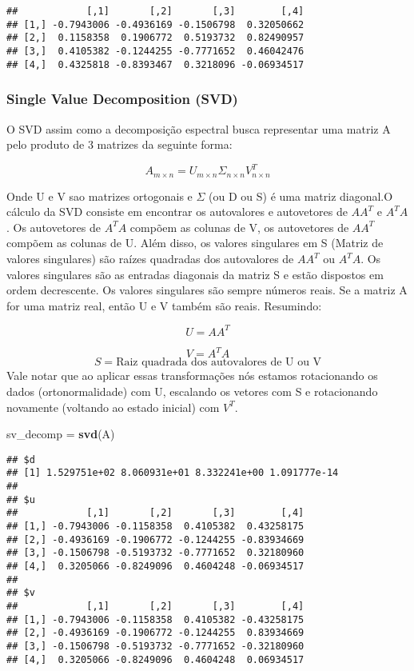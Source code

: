 \documentclass[
]{article}
\newenvironment{Shaded}{\begin{snugshade}}{\end{snugshade}}
\newcommand{\FunctionTok}[1]{\textcolor[rgb]{0.13,0.29,0.53}{\textbf{#1}}}
\newcommand{\NormalTok}[1]{#1}
\newcommand{\OtherTok}[1]{\textcolor[rgb]{0.56,0.35,0.01}{#1}}
\begin{document}
\begin{verbatim}
##            [,1]       [,2]       [,3]        [,4]
## [1,] -0.7943006 -0.4936169 -0.1506798  0.32050662
## [2,]  0.1158358  0.1906772  0.5193732  0.82490957
## [3,]  0.4105382 -0.1244255 -0.7771652  0.46042476
## [4,]  0.4325818 -0.8393467  0.3218096 -0.06934517
\end{verbatim}

\newpage

\hypertarget{single-value-decomposition-svd}{%
\subsubsection{Single Value Decomposition
(SVD)}\label{single-value-decomposition-svd}}

O SVD assim como a decomposição espectral busca representar uma matriz A
pelo produto de 3 matrizes da seguinte forma:

\[
A_{m \times n} = U_{m \times n} \Sigma_{n \times n} V^{T}_{n \times n}
\]

Onde U e V sao matrizes ortogonais e \(\Sigma\) (ou D ou S) é uma matriz
diagonal.O cálculo da SVD consiste em encontrar os autovalores e
autovetores de \(AA^T\) e \(A^TA\). Os autovetores de \(A^TA\) compõem
as colunas de V, os autovetores de \(AA^T\) compõem as colunas de U.
Além disso, os valores singulares em S (Matriz de valores singulares)
são raízes quadradas dos autovalores de \(AA^T\) ou \(A^TA\). Os valores
singulares são as entradas diagonais da matriz S e estão dispostos em
ordem decrescente. Os valores singulares são sempre números reais. Se a
matriz A for uma matriz real, então U e V também são reais. Resumindo:

\[
U = AA^T
\]

\[
V = A^TA
\] \[
S = \text{Raiz quadrada dos autovalores de U ou V} 
\] Vale notar que ao aplicar essas transformações nós estamos
rotacionando os dados (ortonormalidade) com U, escalando os vetores com
S e rotacionando novamente (voltando ao estado inicial) com \(V^T\).

\begin{Shaded}
\begin{Highlighting}[]
\NormalTok{sv\_decomp }\OtherTok{=} \FunctionTok{svd}\NormalTok{(A)}
\end{Highlighting}
\end{Shaded}

\begin{verbatim}
## $d
## [1] 1.529751e+02 8.060931e+01 8.332241e+00 1.091777e-14
## 
## $u
##            [,1]       [,2]       [,3]        [,4]
## [1,] -0.7943006 -0.1158358  0.4105382  0.43258175
## [2,] -0.4936169 -0.1906772 -0.1244255 -0.83934669
## [3,] -0.1506798 -0.5193732 -0.7771652  0.32180960
## [4,]  0.3205066 -0.8249096  0.4604248 -0.06934517
## 
## $v
##            [,1]       [,2]       [,3]        [,4]
## [1,] -0.7943006 -0.1158358  0.4105382 -0.43258175
## [2,] -0.4936169 -0.1906772 -0.1244255  0.83934669
## [3,] -0.1506798 -0.5193732 -0.7771652 -0.32180960
## [4,]  0.3205066 -0.8249096  0.4604248  0.06934517
\end{verbatim}
\end{document}
